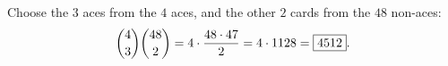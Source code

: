 Choose the $3$ aces from the $4$ aces, and the other $2$ cards from the $48$ non-aces:
\[\dbinom43\dbinom{48}{2}=4\cdot\dfrac{48\cdot47}{2}=4\cdot1128=\boxed{4512}.\]
